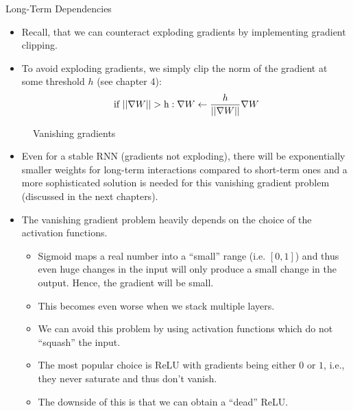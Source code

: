 \begin{vbframe}{Long-Term Dependencies}
  \begin{itemize}
    \item Recall, that we can counteract exploding gradients by implementing gradient clipping.
    \item To avoid exploding gradients, we simply clip the norm of the gradient at some threshold $h$ (see chapter 4): $$\text{if  } ||\nabla W|| > \text h: \nabla W \leftarrow \frac{h}{||\nabla W||} \nabla W $$
  \end{itemize}

\framebreak

  \begin{figure}
      \centering
      \caption{\footnotesize {Vanishing gradients}}
  \end{figure}


  \begin{itemize}
    \item Even for a stable RNN (gradients not exploding), there will be exponentially smaller weights for long-term interactions compared to short-term ones and a more sophisticated solution is needed for this vanishing gradient problem (discussed in the next chapters).
    \item The {vanishing gradient problem} heavily depends on the choice of the activation functions.
    \begin{itemize} 
      \item Sigmoid maps a real number into a \enquote{small} range (i.e. $[0, 1]$) and thus even huge changes in the input will only produce a small change in the output. Hence, the gradient will be small.
      \item This becomes even worse when we stack multiple layers.
      \item We can avoid this problem by using activation functions which do not \enquote{squash} the input.
      \item The most popular choice is ReLU with gradients being either $0$ or $1$, i.e., they never saturate and thus don't vanish.
      \item The downside of this is that we can obtain a \enquote{dead} ReLU.
    \end{itemize}


\end{itemize}
\end{vbframe}
